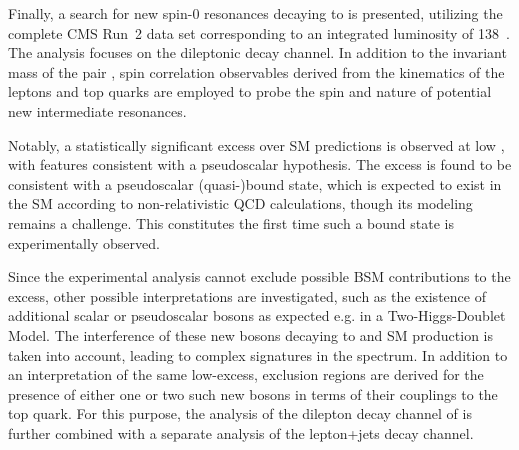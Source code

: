 
Finally, a search for new spin-0 resonances decaying to \ttbar is presented, utilizing the complete CMS Run~2 data set corresponding to an integrated luminosity of \SI{138}{\fbinv}~\cite{CMS:TOP-24-007,CMS:HIG-22-013}. The analysis focuses on the dileptonic decay channel. In addition to the invariant mass of the \ttbar pair \mtt, spin correlation observables derived from the kinematics of the leptons and top quarks are employed to probe the spin and \CP nature of potential new intermediate resonances. 

Notably, a statistically significant excess over SM predictions is observed at low \mtt, with features consistent with a pseudoscalar hypothesis.
The excess is found to be consistent with a pseudoscalar \ttbar (quasi-)bound state, which is expected to exist in the SM according to non-relativistic QCD calculations, though its modeling remains a challenge. This constitutes the first time such a \ttbar bound state is experimentally observed.


Since the experimental analysis cannot exclude possible BSM contributions to the excess, other possible interpretations are investigated, such as the existence of additional scalar or pseudoscalar bosons as expected e.g. in a Two-Higgs-Doublet Model. 
The interference of these new bosons decaying to \ttbar and SM \ttbar production is taken into account, leading to complex signatures in the \mtt spectrum. In addition to an interpretation of the same low-\mtt excess, exclusion regions are derived for the presence of either one or two such new bosons in terms of their couplings to the top quark. For this purpose, the analysis of the dilepton decay channel of \ttbar is further combined with a separate analysis of the lepton+jets decay channel.

